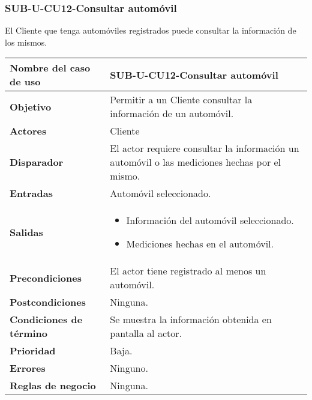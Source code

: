 \subsubsection{SUB-U-CU12-Consultar automóvil}\label{SUB-U-CU12}
El Cliente que tenga automóviles registrados puede consultar la información de los mismos.

\begin{longtable}{|J{5cm}|J{10.3cm}|}
	\hline
	\textbf{Nombre del caso de uso} &
		SUB-U-CU12-Consultar automóvil \\ \hline
	\textbf{Objetivo} &
		Permitir a un Cliente consultar la información de un automóvil. \\ \hline
	\textbf{Actores} &
		Cliente \\ \hline 
	\textbf{Disparador} & 
		El actor requiere consultar la información un automóvil o las mediciones hechas por el mismo. \\ \hline 
	\textbf{Entradas} & Automóvil seleccionado.
		\\ \hline 
	\textbf{Salidas} & 
		\begin{itemize}
			\item Información del automóvil seleccionado.
			\item Mediciones hechas en el automóvil.
		\end{itemize} 
		\\ \hline
	\textbf{Precondiciones} & El actor tiene registrado al menos un automóvil.
		\\ \hline
	\textbf{Postcondiciones} & Ninguna.
		\\ \hline
	\textbf{Condiciones de término} & Se muestra la información obtenida en pantalla al actor.
		\\ \hline 
	\textbf{Prioridad} & 
		Baja. \\ \hline
	\textbf{Errores} & Ninguno.
		\\ \hline
	\textbf{Reglas de negocio} & Ninguna.
		 \\ \hline
\end{longtable}

